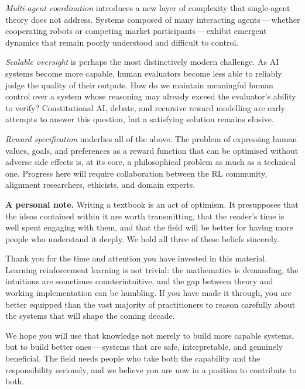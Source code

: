 \emph{Multi-agent coordination} introduces a new layer of complexity that single-agent
theory does not address.  Systems composed of many interacting agents\,---\,whether
cooperating robots or competing market participants\,---\,exhibit emergent dynamics that
remain poorly understood and difficult to control.

\emph{Scalable oversight} is perhaps the most distinctively modern challenge.  As AI systems
become more capable, human evaluators become less able to reliably judge the quality of
their outputs.  How do we maintain meaningful human control over a system whose reasoning
may already exceed the evaluator's ability to verify?  Constitutional AI, debate, and
recursive reward modelling are early attempts to answer this question, but a satisfying
solution remains elusive.

\emph{Reward specification} underlies all of the above.  The problem of expressing human
values, goals, and preferences as a reward function that can be optimised without adverse
side effects is, at its core, a philosophical problem as much as a technical one.  Progress
here will require collaboration between the RL community, alignment researchers, ethicists,
and domain experts.

\medskip

\textbf{A personal note.}\quad
Writing a textbook is an act of optimism.  It presupposes that the ideas contained within it
are worth transmitting, that the reader's time is well spent engaging with them, and that
the field will be better for having more people who understand it deeply.  We hold all three
of these beliefs sincerely.

Thank you for the time and attention you have invested in this material.  Learning
reinforcement learning is not trivial: the mathematics is demanding, the intuitions are
sometimes counterintuitive, and the gap between theory and working implementation can be
humbling.  If you have made it through, you are better equipped than the vast majority of
practitioners to reason carefully about the systems that will shape the coming decade.

We hope you will use that knowledge not merely to build more capable systems, but to build
better ones\,---\,systems that are safe, interpretable, and genuinely beneficial.  The
field needs people who take both the capability and the responsibility seriously, and we
believe you are now in a position to contribute to both.

\medskip

